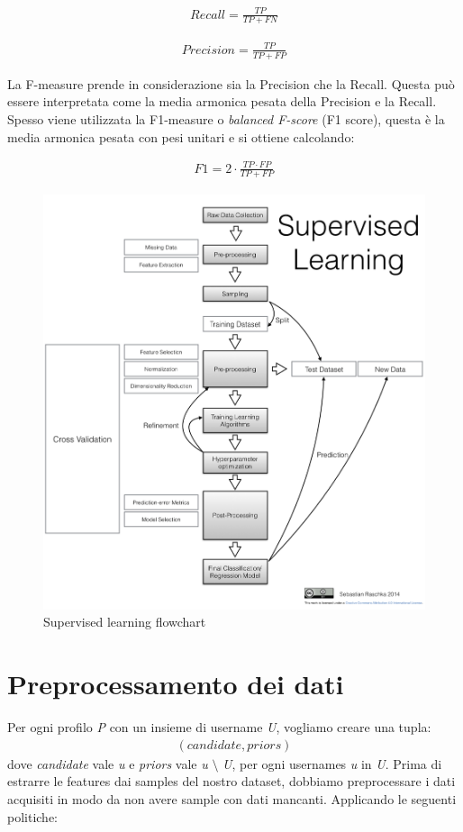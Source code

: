 \begin{gather*}
	Recall = \frac{TP}{TP + FN}
\end{gather*}

\begin{gather*}
	Precision = \frac{TP}{TP + FP}
\end{gather*}

La F-measure prende in considerazione sia la Precision che la Recall. Questa può essere interpretata come la media armonica pesata della Precision e la Recall. Spesso viene  utilizzata la F1-measure o \textit{balanced F-score} (F1 score), questa è la media armonica pesata con pesi unitari e si ottiene calcolando:

\begin{gather*}
	F1 = 2 \cdot \frac{TP \cdot FP}{TP + FP}
\end{gather*}


\begin{figure}[bp!]
\centering
\includegraphics[width=130mm]{chapters/process_pipeline/supervised_learning_flowchart.png}
\caption{Supervised learning flowchart \label{overflow}}
\end{figure}

\section{Preprocessamento dei dati}
Per ogni profilo \textit{P} con un insieme di username \textit{U}, vogliamo creare una tupla:
\begin{gather*}
	(candidate, priors)
\end{gather*}
dove \textit{candidate} vale \textit{u} e \textit{priors}  vale \textit{u} $\setminus$ \textit{U}, per ogni usernames \textit{u} in \textit{U}.
\newline
Prima di estrarre le features dai samples del nostro dataset, dobbiamo preprocessare i dati acquisiti in modo da non avere sample con dati mancanti. Applicando le seguenti politiche:

